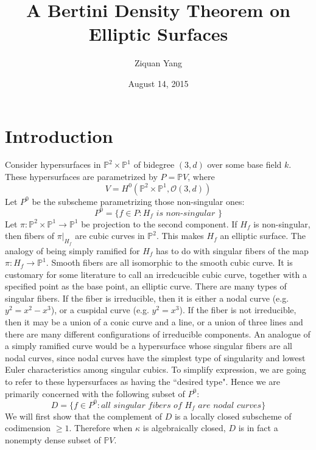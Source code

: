 \documentclass[12pt]{article}
\theoremstyle{plain}
\theoremstyle{definition}
\newcommand{\IP}{\mathbb{P}}
\newcommand{\sO}{\mathcal{O}}
\newcommand{\<}{\langle}
\renewcommand{\>}{\rangle}
\begin{document}
%

\title{A Bertini Density Theorem on Elliptic Surfaces}
\author{Ziquan Yang}


\date{August 14, 2015}


\maketitle
 

\setcounter{section}{0}

\section{Introduction}
Consider hypersurfaces in $\IP^2 \times \IP^1$ of bidegree $(3, d)$ over some base field $k$. These hypersurfaces are parametrized by $P = \IP V$, where
$$ V = H^0 ( \IP^2 \times \IP^1, \sO(3, d) ) $$
Let $P^0$ be the subscheme parametrizing those non-singular ones:
$$ P^0 = \{ f \in P : H_f \textit{ is non-singular }\} $$
Let $\pi : \IP^2 \times \IP^1 \to \IP^1$ be projection to the second component. If $H_f$ is non-singular, then fibers of $\pi|_{H_f}$ are cubic curves in $\IP^2$. This makes $H_f$ an elliptic surface. The analogy of being simply ramified for $H_f$ has to do with singular fibers of the map $\pi : H_f \to \IP^1$. Smooth fibers are all isomorphic to the smooth cubic curve. It is customary for some literature to call an irredcucible cubic curve, together with a specified point as the base point, an elliptic curve. There are many types of singular fibers. If the fiber is irreducible, then it is either a nodal curve (e.g. $y^2 = x^2 - x^3$), or a cuspidal curve (e.g. $y^2 = x^3$). If the fiber is not irreducible, then it may be a union of a conic curve and a line, or a union of three lines and there are many different configurations of irreducible components. 
An analogue of a simply ramified curve would be a hypersurface whose singular fibers are all nodal curves, since nodal curves have the simplest type of singularity and lowest Euler characteristics among singular cubics. To simplify expression, we are going to refer to these hypersurfaces as having the ``desired type". Hence we are primarily concerned with the following subset of $P^0$: 
$$ D = \{ f \in P^0 : \textit{all singular fibers of $H_f$ are nodal curves} \}$$ 
We will first show that the complement of $D$ is a locally closed subscheme of codimension $\ge 1$. Therefore when $\kappa$ is algebraically closed, $D$ is in fact a nonempty dense subset of $\IP V$. 
\end{document}

